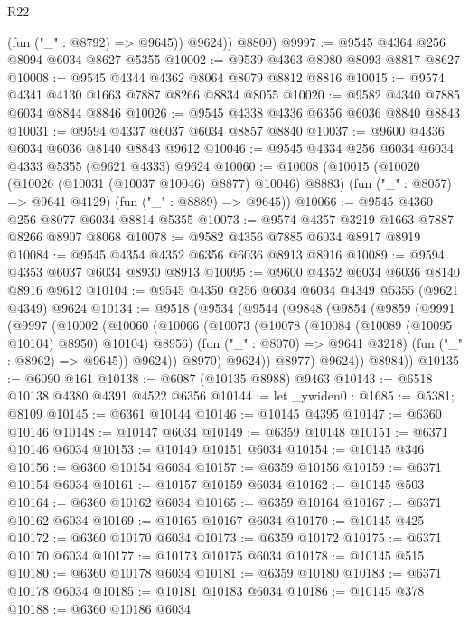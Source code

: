\begin{lexlean}{R22}
\begin{coremodule}
            (fun ("_" : @8792) => @9645))
          @9624))
      @8800)
@9997 := @9545 @4364 @256 @8094 @6034 @8627 @5355
@10002 := @9539 @4363 @8080 @8093 @8817 @8627
@10008 := @9545 @4344 @4362 @8064 @8079 @8812 @8816
@10015 := @9574 @4341 @4130 @1663 @7887 @8266 @8834 @8055
@10020 := @9582 @4340 @7885 @6034 @8844 @8846
@10026 := @9545 @4338 @4336 @6356 @6036 @8840 @8843
@10031 := @9594 @4337 @6037 @6034 @8857 @8840
@10037 := @9600 @4336 @6034 @6036 @8140 @8843 @9612
@10046 := @9545 @4334 @256 @6034 @6034 @4333 @5355 (@9621 @4333) @9624
@10060 := @10008
    (@10015
      (@10020 (@10026 (@10031 (@10037 @10046) @8877) @10046) @8883)
      (fun ("_" : @8057) => @9641 @4129)
      (fun ("_" : @8889) => @9645))
@10066 := @9545 @4360 @256 @8077 @6034 @8814 @5355
@10073 := @9574 @4357 @3219 @1663 @7887 @8266 @8907 @8068
@10078 := @9582 @4356 @7885 @6034 @8917 @8919
@10084 := @9545 @4354 @4352 @6356 @6036 @8913 @8916
@10089 := @9594 @4353 @6037 @6034 @8930 @8913
@10095 := @9600 @4352 @6034 @6036 @8140 @8916 @9612
@10104 := @9545 @4350 @256 @6034 @6034 @4349 @5355 (@9621 @4349) @9624
@10134 := @9518
    (@9534
      (@9544
        (@9848
          (@9854
            (@9859
              (@9991
                (@9997
                  (@10002
                    (@10060
                      (@10066
                        (@10073
                          (@10078 (@10084 (@10089 (@10095 @10104) @8950) @10104) @8956)
                          (fun ("_" : @8070) => @9641 @3218)
                          (fun ("_" : @8962) => @9645))
                        @9624))
                    @8970)
                  @9624))
              @8977)
            @9624))
        @8984))
@10135 := @6090 @161
@10138 := @6087 (@10135 @8988) @9463
@10143 := @6518 @10138 @4380 @4391 @4522 @6356
@10144 := let _ywiden0 : @1685 := @5381; @8109
@10145 := @6361 @10144
@10146 := @10145 @4395
@10147 := @6360 @10146
@10148 := @10147 @6034
@10149 := @6359 @10148
@10151 := @6371 @10146 @6034
@10153 := @10149 @10151 @6034
@10154 := @10145 @346
@10156 := @6360 @10154 @6034
@10157 := @6359 @10156
@10159 := @6371 @10154 @6034
@10161 := @10157 @10159 @6034
@10162 := @10145 @503
@10164 := @6360 @10162 @6034
@10165 := @6359 @10164
@10167 := @6371 @10162 @6034
@10169 := @10165 @10167 @6034
@10170 := @10145 @425
@10172 := @6360 @10170 @6034
@10173 := @6359 @10172
@10175 := @6371 @10170 @6034
@10177 := @10173 @10175 @6034
@10178 := @10145 @515
@10180 := @6360 @10178 @6034
@10181 := @6359 @10180
@10183 := @6371 @10178 @6034
@10185 := @10181 @10183 @6034
@10186 := @10145 @378
@10188 := @6360 @10186 @6034

\end{coremodule}
\end{lexlean}
